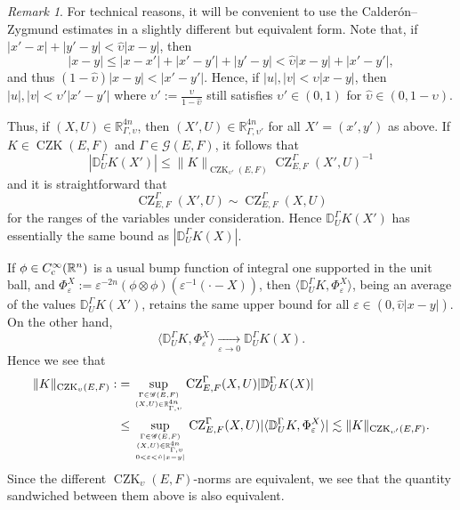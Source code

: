 \documentclass[11pt, reqno]{amsart}
\theoremstyle{definition}
\theoremstyle{remark}
\newtheorem{remark}[theorem]{Remark}
\numberwithin{equation}{section}
\newcommand{\R}{\mathbb R}
\newcommand{\eps}{\varepsilon}
\newcommand{\pair}[2]{\langle #1, #2 \rangle}
\newcommand{\abs}[1]{|#1|}
\newcommand{\Norm}[2]{\|#1\|_{#2}}
\begin{document}
\begin{remark}\label{rem:CZK1}
For technical reasons, it will be convenient to use the Calder\'on--Zygmund estimates in a slightly different but equivalent form. Note that, if $\abs{x'-x}+\abs{y'-y}<\hat\upsilon\abs{x-y}$, then
\begin{equation*}
   \abs{x-y}\leq\abs{x-x'}+\abs{x'-y'}+\abs{y'-y}<\hat\upsilon\abs{x-y}+\abs{x'-y'},
\end{equation*}
and thus $(1-\hat\upsilon)\abs{x-y}<\abs{x'-y'}$. Hence, if $\abs{u},\abs{v}<\upsilon\abs{x-y}$, then $\abs{u},\abs{v}<\upsilon'\abs{x'-y'}$ where $\upsilon':=\frac{\upsilon}{1-\hat\upsilon}$ still satisfies $\upsilon'\in(0,1)$ for $\hat\upsilon\in(0,1-\upsilon)$.

Thus, if $(X,U)\in\R^{4n}_{\Gamma,\upsilon}$, then $(X',U)\in\R^{4n}_{\Gamma,\upsilon'}$ for all $X'=(x',y')$ as above. If $K\in\operatorname{CZK}(E,F)$ and $\Gamma\in\mathscr G(E,F)$, it follows that
\begin{equation*}
   \abs{\mathbb D^\Gamma_U K(X')}
   \leq\Norm{K}{\operatorname{CZK}_{\upsilon'}(E,F)}
   \operatorname{CZ}^{\Gamma}_{E,F}(X',U)^{-1}
\end{equation*}
and it is straightforward that
\begin{equation*}
  \operatorname{CZ}^{\Gamma}_{E,F}(X',U)
     \sim\operatorname{CZ}^{\Gamma}_{E,F}(X,U)
\end{equation*}
for the ranges of the variables under consideration. Hence $\mathbb D^\Gamma_U K(X')$ has essentially the same bound as $\abs{\mathbb D^\Gamma_U K(X)}$.

If $\phi\in C_{\rm c}^\infty(\R^n)$ is a usual bump function of integral one supported in the unit ball, and $\Phi^X_{\eps}:=\eps^{-2n}(\phi\otimes\phi)(\eps^{-1}(\cdot-X))$, then $\pair{\mathbb D_U^{\Gamma}K}{\Phi^X_\eps}$, being an average of the values $\mathbb D_U^{\Gamma}K(X')$, retains the same upper bound for all $\eps\in(0,\hat\upsilon\abs{x-y})$. On the other hand,
\begin{equation*}
  \pair{\mathbb D_U^{\Gamma}K}{\Phi^X_\eps}
  \underset{\eps\to 0}{\longrightarrow} \mathbb D_U^{\Gamma}K(X).
\end{equation*}
Hence we see that
\begin{equation*}
\begin{split}
  \Norm{K}{\operatorname{CZK}_\upsilon(E,F)}
  :&=\sup_{\genfrac{}{}{0pt}{}{\Gamma\in\mathscr G(E,F)}{(X,U)\in\R^{4n}_{\Gamma,\upsilon}}}
  \operatorname{CZ}_{E,F}^{\Gamma}(X,U)\abs{\mathbb D_U^\Gamma K(X)} \\
  &\leq \sup_{\genfrac{}{}{0pt}{}{\genfrac{}{}{0pt}{}{\Gamma\in\mathscr G(E,F)}
   {(X,U)\in\R^{4n}_{\Gamma,\upsilon}}}{0<\eps<\hat\upsilon\abs{x-y}}}
  \operatorname{CZ}_{E,F}^{\Gamma}(X,U)\abs{\pair{\mathbb D_U^\Gamma K}{\Phi_\eps^X}}
  \lesssim \Norm{K}{\operatorname{CZK}_{\upsilon'}(E,F)}.
\end{split}
\end{equation*}
Since the different $\operatorname{CZK}_\upsilon(E,F)$-norms are equivalent, we see that the quantity sandwiched between them above is also equivalent.


\end{remark}
\end{document}
